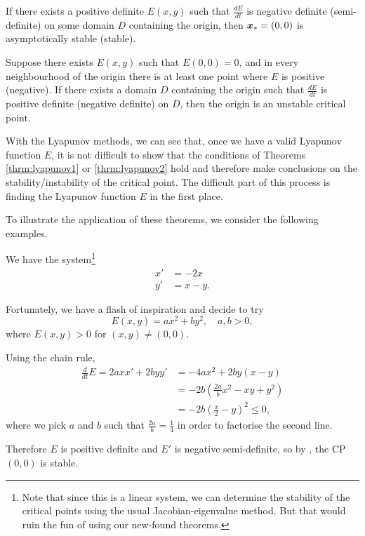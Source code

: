 \begin{theorem}\label{thrm:lyapunov1}
	If there exists a positive definite $E(x,y)$ such that $\frac{dE}{dt}$ is negative definite (semi-definite) on some domain $D$ containing the origin, then $\bm{x}_{\ast} = (0,0)$ is asymptotically stable (stable).
\end{theorem}

\begin{theorem}\label{thrm:lyapunov2}
	Suppose there exists $E(x,y)$ such that $E(0,0)=0$, and in every neighbourhood of the origin there is at least one point where $E$ is positive (negative). If there exists a domain $D$ containing the origin such that $\frac{dE}{dt}$ is positive definite (negative definite) on $D$, then the origin is an unstable critical point.
\end{theorem}

With the Lyapunov methods, we can see that, once we have a valid Lyapunov function $E$, it is not difficult to show that the conditions of Theorems \ref{thrm:lyapunov1} or \ref{thrm:lyapunov2} hold and therefore make conclusions on the stability/instability of the critical point. The difficult part of this process is finding the Lyapunov function $E$ in the first place.

To illustrate the application of these theorems, we consider the following examples.

\begin{eg}
	We have the system\footnote{Note that since this is a linear system, we can determine the stability of the critical points using the usual Jacobian-eigenvalue method. But that would ruin the fun of using our new-found theorems.}
	\begin{align*}
		x' &= -2x \\
		y' &= x-y.
	\end{align*}
	
	Fortunately, we have a flash of inspiration and decide to try
	\[
	E(x,y) = ax^2 + by^2, \quad a,b>0,
	\]
	where $E(x,y)>0$ for $(x,y)\neq(0,0)$.
	
	Using the chain rule,
	\begin{align*}
		\frac{d}{dt}E = 2axx' + 2byy' &= -4ax^2 + 2by(x-y) \\
		&= -2b\left(\frac{2a}{b}x^2 - xy + y^2\right) \\
		&= -2b\left(\frac{x}{2} - y\right)^2 \leq 0,
	\end{align*}
	where we pick $a$ and $b$ such that $\frac{2a}{b} = \frac14$ in order to factorise the second line.
	
	Therefore $E$ is positive definite and $E'$ is negative semi-definite, so by , the CP $(0,0)$ is stable.
\end{eg}

